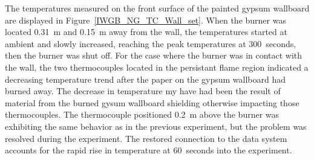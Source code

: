 \documentclass[twoside]{uocthesis}
\begin{document}
{The temperatures measured on the front surface of the painted gypsum wallboard are displayed in Figure~\ref{IWGB_NG_TC_Wall_set}.  When the burner was located 0.31~m and 0.15~m away from the wall, the temperatures started at ambient and slowly increased, reaching the peak temperatures at 300~seconds, then the burner was shut off.  For the case where the burner was in contact with the wall, the two thermocouples located in the persistant flame region indicated a decreasing temperature trend after the paper on the gypsum wallboard had burned away.  The decrease in temperature my have had been the result of material from the burned gysum wallboard shielding otherwise impacting those thermocouples. The thermocouple positioned 0.2~m above the burner was exhibiting the same behavior as in the previous experiment, but the problem was resolved during the experiment.  The restored connection to the data system accounts for the rapid rise in temperature at 60~seconds into the experiment.  

}
\end{document}

